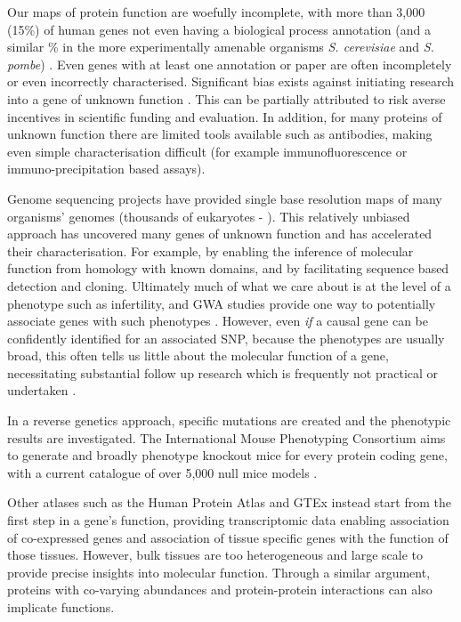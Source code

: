 Our maps of protein function are woefully incomplete, with more than 3,000 (15\%) of human genes not even having a biological process annotation (and a similar \% in the more experimentally amenable organisms \textit{S. cerevisiae} and \textit{S. pombe}) \parencite{Wood2019Hidden}.
Even genes with at least one annotation or paper are often incompletely or even incorrectly characterised.
Significant bias exists against initiating research into a gene of unknown function \parencite{Edwards2011Too, Stoeger2018Largescale, Haynes2018Gene}.
This can be partially attributed to risk averse incentives in scientific funding and evaluation.
In addition, for many proteins of unknown function there are limited tools available such as antibodies, making even simple characterisation difficult (for example immunofluorescence or immuno-precipitation based assays).


Genome sequencing projects have provided single base resolution maps of many organisms' genomes (thousands of eukaryotes - \cite{Genome}).
This relatively unbiased approach has uncovered many genes of unknown function and has accelerated their characterisation.
For example, by enabling the inference of molecular function from homology with known domains, and by facilitating sequence based detection and cloning.
Ultimately much of what we care about is at the level of a phenotype such as infertility, and GWA studies provide one way to potentially associate genes with such phenotypes \parencite{Gajbhiye2018Complex}.
However, even \emph{if} a causal gene can be confidently identified for an associated SNP, because the phenotypes are usually broad, this often tells us little about the molecular function of a gene, necessitating substantial follow up research which is frequently not practical or undertaken \parencite{Visscher201710, Gallagher2018PostGWAS, Struck2018impact}.

In a reverse genetics approach, specific mutations are created and the phenotypic results are investigated.
The International Mouse Phenotyping Consortium aims to generate and broadly phenotype knockout mice for every protein coding gene, with a current catalogue of over 5,000 null mice models \parencite{2004Knockout,Meehan2017Disease, Birling2019resource}.

Other atlases such as the Human Protein Atlas and GTEx instead start from the first step in a gene's function, providing transcriptomic data enabling association of co-expressed genes and association of tissue specific genes with the function of those tissues.
However, bulk tissues are too heterogeneous and large scale to provide precise insights into molecular function.
Through a similar argument, proteins with co-varying abundances and protein-protein interactions can also implicate functions.

